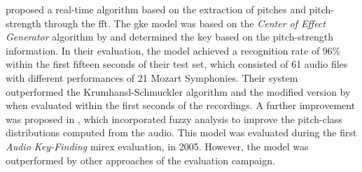 \textcite{chuan2005polyphonic} proposed a real-time
algorithm based on the extraction of pitches and
pitch-strength through the \acrfull{fft}. The \gls{gke}
model was based on the \emph{Center of Effect Generator}
algorithm by \textcite{chew2002spiral} and determined the
key based on the pitch-strength information. In their
evaluation, the model achieved a recognition rate of 96\%
within the first fifteen seconds of their test set, which
consisted of 61 audio files with different performances of
21 Mozart Symphonies. Their system outperformed the
Krumhansl-Schmuckler algorithm
\parencite{krumhansl1990cognitive} and the modified version
by \textcite{temperley1999whats} when evaluated within the
first seconds of the recordings. A further improvement was
proposed in \textcite{chuan2005fuzzy}, which incorporated
fuzzy analysis to improve the pitch-class distributions
computed from the audio. This model was evaluated during the
first \emph{Audio Key-Finding} \gls{mirex} evaluation, in
2005. However, the model was outperformed by other
approaches of the evaluation
campaign.



